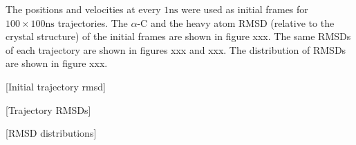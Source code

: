 The positions and velocities at every $1\mathrm{ns}$ were used as initial frames for $100 \times 100 \mathrm{ns}$ trajectories. The $\alpha$-C and the heavy atom RMSD (relative to the crystal structure) of the initial frames are shown in figure xxx. The same RMSDs of each trajectory are shown in figures xxx and xxx. The distribution of RMSDs are shown in figure xxx. 

[Initial trajectory rmsd]

[Trajectory RMSDs]

[RMSD distributions]

